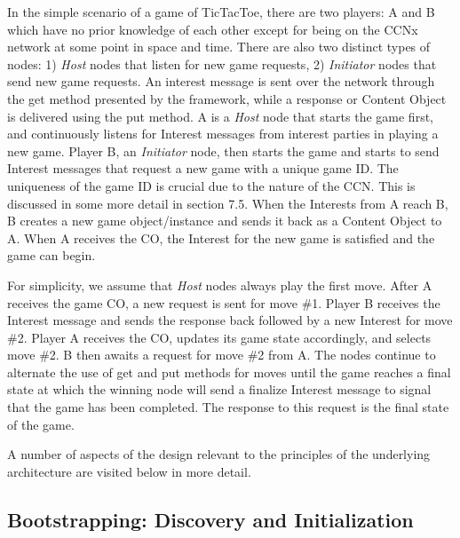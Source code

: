\documentclass[a4paper,12pt]{report}      %
\begin{document}
In the simple scenario of a game of TicTacToe, there are two players: A and B which have no prior
knowledge of each other except for being on the CCNx network at some point in space and time. There
are also two distinct types of nodes: 1) \emph{Host} nodes that listen for new game requests, 2) \emph{Initiator} nodes
that send new game requests. An interest message is sent over the network through the get method
presented by the framework, while a response or Content Object is delivered using the put method.
A is a \emph{Host} node that starts the game first, and continuously listens for Interest messages from interest
parties in playing a new game. Player B, an \emph{Initiator} node, then starts the game and starts to send
Interest messages that request a new game with a unique game ID. The uniqueness of the game ID is
crucial due to the nature of the CCN. This is discussed in some more detail in section 7.5. When the
Interests from A reach B, B creates a new game object/instance and sends it back as a Content Object
to A. When A receives the CO, the Interest for the new game is satisfied and the game can begin.

For simplicity, we assume that \emph{Host} nodes always play the first move. After A receives the game CO, a
new request is sent for move \#1. Player B receives the Interest message and sends the response back
followed by a new Interest for move \#2. Player A receives the CO, updates its game state accordingly,
and selects move \#2. B then awaits a request for move \#2 from A. The nodes continue to alternate the
use of get and put methods for moves until the game reaches a final state at which the winning node
will send a finalize Interest message to signal that the game has been completed. The response to this
request is the final state of the game.

A number of aspects of the design relevant to the principles of the underlying architecture are visited below in more detail.


\subsection{Bootstrapping: Discovery and Initialization}
\end{document}
